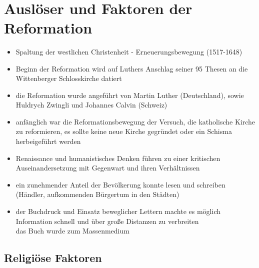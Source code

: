 \documentclass[11pt,a4paper]{article}
\begin{document}
{\bfseries \color{familynamecolor}{Die Reformation und Glaubensspaltung in Europa}}\\[0.75em]

\section*{\textsf{Auslöser und Faktoren der Reformation}}

\begin{itemize}
\item Spaltung der westlichen Christenheit - Erneuerungsbewegung (1517-1648)
\item Beginn der Reformation wird auf Luthers Anschlag seiner 95 Thesen an die Wittenberger Schlosskirche datiert
\item die Reformation wurde angeführt von Martin Luther (Deutschland), sowie Huldrych Zwingli und Johannes Calvin (Schweiz)
\item anfänglich war die Reformationsbewegung der Versuch, die katholische Kirche zu reformieren, es sollte keine neue Kirche gegründet oder ein Schisma herbeigeführt werden


\item Renaissance und humanistisches Denken führen zu einer kritischen Auseinandersetzung mit Gegenwart und ihren Verhältnissen
\item ein zunehmender Anteil der Bevölkerung konnte lesen und schreiben (Händler, aufkommenden Bürgertum in den Städten)
\item der Buchdruck und Einsatz beweglicher Lettern machte es möglich Information schnell und über große Distanzen zu verbreiten\\
	 das Buch wurde zum Massenmedium\\


\end{itemize}


\subsection*{\textsf{Religiöse Faktoren}}
\end{document}
